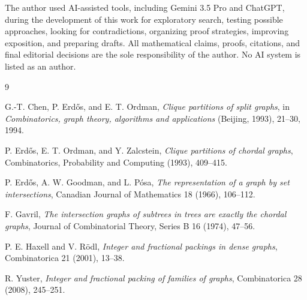 \documentclass[11pt]{article}
\theoremstyle{definition}
\begin{document}
The author used AI-assisted tools, including Gemini 3.5 Pro and ChatGPT, during the development of this work for exploratory search, testing possible approaches, looking for contradictions, organizing proof strategies, improving exposition, and preparing drafts. All mathematical claims, proofs, citations, and final editorial decisions are the sole responsibility of the author. No AI system is listed as an author.

\begin{thebibliography}{9}

G.-T. Chen, P. Erdős, and E. T. Ordman,
\emph{Clique partitions of split graphs},
in \emph{Combinatorics, graph theory, algorithms and applications} (Beijing, 1993), 21--30, 1994.

P. Erdős, E. T. Ordman, and Y. Zalcstein,
\emph{Clique partitions of chordal graphs},
Combinatorics, Probability and Computing (1993), 409--415.

P. Erdős, A. W. Goodman, and L. Pósa,
\emph{The representation of a graph by set intersections},
Canadian Journal of Mathematics 18 (1966), 106--112.

F. Gavril,
\emph{The intersection graphs of subtrees in trees are exactly the chordal graphs},
Journal of Combinatorial Theory, Series B 16 (1974), 47--56.

P. E. Haxell and V. Rödl,
\emph{Integer and fractional packings in dense graphs},
Combinatorica 21 (2001), 13--38.

R. Yuster,
\emph{Integer and fractional packing of families of graphs},
Combinatorica 28 (2008), 245--251.

\end{thebibliography}
\end{document}
